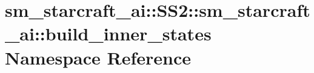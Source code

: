 \hypertarget{namespacesm__starcraft__ai_1_1SS2_1_1sm__starcraft__ai_1_1build__inner__states}{}\section{sm\+\_\+starcraft\+\_\+ai\+:\+:S\+S2\+:\+:sm\+\_\+starcraft\+\_\+ai\+:\+:build\+\_\+inner\+\_\+states Namespace Reference}
\label{namespacesm__starcraft__ai_1_1SS2_1_1sm__starcraft__ai_1_1build__inner__states}
